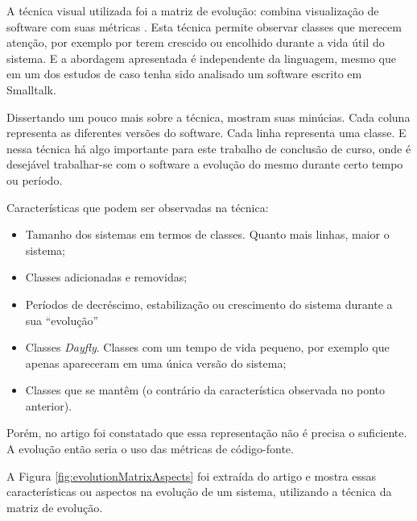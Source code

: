 A técnica visual utilizada foi a matriz de evolução: combina visualização de
software com suas métricas \cite{lanza2001evolution}. Esta técnica permite
observar classes que merecem atenção, por exemplo por terem crescido ou
encolhido durante a vida útil do sistema. E a abordagem apresentada é
independente da linguagem, mesmo que em um dos estudos de caso tenha sido
analisado um software escrito em Smalltalk.

Dissertando um pouco mais sobre a técnica, 
mostram suas minúcias. Cada coluna representa as diferentes versões do
software. Cada linha representa uma classe. E nessa técnica há algo importante
para este trabalho de conclusão de curso, onde é desejável trabalhar-se com o
software a evolução do mesmo durante certo tempo ou período.

Características que podem ser observadas na técnica:

\begin{itemize}
  \item Tamanho dos sistemas em termos de classes. Quanto mais linhas, maior o
  sistema;
  \item Classes adicionadas e removidas;
  \item Períodos de decréscimo, estabilização ou crescimento do sistema durante a
  sua ``evolução''
  \item Classes \textit{Dayfly}. Classes com um tempo de vida pequeno, por
  exemplo que apenas apareceram em uma única versão do sistema;
  \item Classes que se mantêm (o contrário da característica observada no ponto
  anterior).
\end{itemize}

Porém, no artigo foi constatado que essa representação não é precisa o suficiente.
A evolução então seria o uso das métricas de código-fonte.

A Figura \ref{fig:evolutionMatrixAspects} foi extraída do artigo e mostra essas
características ou aspectos na evolução de um sistema, utilizando a técnica da
matriz de evolução.

